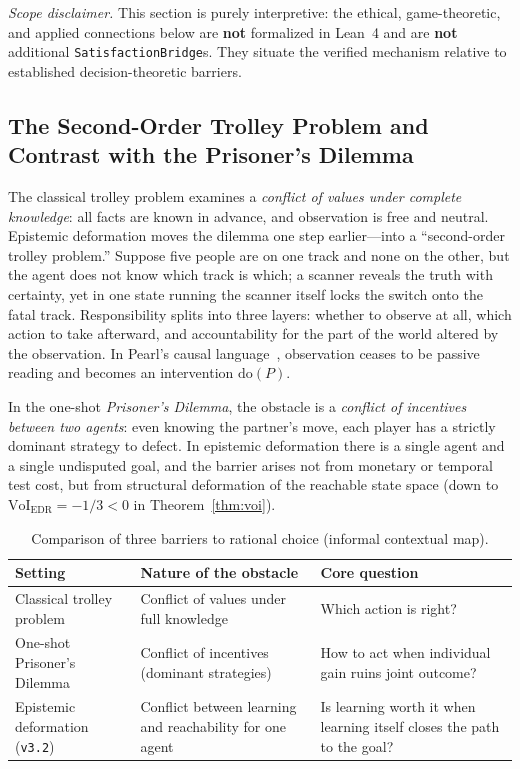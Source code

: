 \documentclass[10pt,a4paper]{article}
\theoremstyle{cleanthm}
\theoremstyle{cleandef}
\begin{document}
\emph{Scope disclaimer.} This section is purely interpretive: the ethical, game-theoretic, and applied connections below are \textbf{not} formalized in Lean~4 and are \textbf{not} additional \texttt{Satisfaction\allowbreak Bridge}s. They situate the verified mechanism relative to established decision-theoretic barriers.

\subsection{The Second-Order Trolley Problem and Contrast with the Prisoner's Dilemma}

The classical trolley problem examines a \emph{conflict of values under complete knowledge}: all facts are known in advance, and observation is free and neutral. Epistemic deformation moves the dilemma one step earlier—into a ``second-order trolley problem.'' Suppose five people are on one track and none on the other, but the agent does not know which track is which; a scanner reveals the truth with certainty, yet in one state running the scanner itself locks the switch onto the fatal track. Responsibility splits into three layers: whether to observe at all, which action to take afterward, and accountability for the part of the world altered by the observation. In Pearl's causal language~\cite{pearl2009}, observation ceases to be passive reading and becomes an intervention $\mathrm{do}(P)$.

In the one-shot \emph{Prisoner's Dilemma}, the obstacle is a \emph{conflict of incentives between two agents}: even knowing the partner's move, each player has a strictly dominant strategy to defect. In epistemic deformation there is a single agent and a single undisputed goal, and the barrier arises not from monetary or temporal test cost, but from structural deformation of the reachable state space (down to $\mathrm{VoI}_{\mathrm{EDR}}=-1/3<0$ in Theorem~\ref{thm:voi}).

\begin{table}[!htbp]
\centering
\caption{Comparison of three barriers to rational choice (informal contextual map).}
\label{tab:trolley_pd_edr}
\small
\begin{tabularx}{\linewidth}{@{}>{\raggedright\arraybackslash}p{38mm} >{\raggedright\arraybackslash}X >{\raggedright\arraybackslash}X@{}}
\toprule
\textbf{Setting} & \textbf{Nature of the obstacle} & \textbf{Core question} \\
\midrule
Classical trolley problem & Conflict of values under full knowledge & Which action is right? \\
One-shot Prisoner's Dilemma & Conflict of incentives (dominant strategies) & How to act when individual gain ruins joint outcome? \\
Epistemic deformation (\texttt{v3.2}) & Conflict between learning and reachability for one agent & Is learning worth it when learning itself closes the path to the goal? \\
\bottomrule
\end{tabularx}
\end{table}
\end{document}
